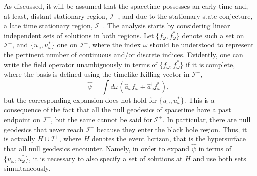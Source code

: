 \documentclass[
12pt,		%
openright,	%
twoside,  %
a4paper,			%
chapter=TITLE,		%
english,			%
french,				%
spanish,			%
brazil				%
]{USPSC-classe/USPSC}
\begin{document}
As discussed, it will be assumed that the spacetime possesses an early time and, at least, distant stationary region, $\mathscr{I}^-$, and due to the stationary state conjecture, a late time stationary region, $\mathscr{I}^+$. The analysis starts by considering linear independent sets of solutions in both regions. Let $\{f_{\omega},f_{\omega}^*\}$ denote such a set on $\mathscr{I}^-$, and $\{u_{\omega},u_{\omega}^*\}$ one on $\mathscr{I}^+$, where the index $\omega$ should be understood to represent the pertinent number of continuous and/or discrete indices. Evidently, one can write the field operator unambiguously in terms of $\{f_{\omega},f_{\omega}^*\}$ if it is complete, where the basis is defined using the timelike Killing vector in $\mathscr{I}^-$, 
\begin{equation}\label{7890}
    \hat{\psi}=\int d\omega(\hat{a}_{\omega}f_{\omega}+\hat{a}^{\dag}_{\omega}f_{\omega}^*),
\end{equation}
but the corresponding expansion does not hold for $\{u_{\omega},u_{\omega}^*\}$. This is a consequence of the fact that all the null geodesics of spacetime have a past endpoint on $\mathscr{I}^-$, but the same cannot be said for $\mathscr{I}^+$. In particular, there are null geodesics that never reach $\mathscr{I}^+$ because they enter the black hole region. Thus, it is actually $H\cup\mathscr{I}^+$, where $H$ denotes the event horizon, that is the hypersurface that all null geodesics encounter. Namely, in order to expand $\hat{\psi}$ in terms of $\{u_{\omega},u_{\omega}^*\}$, it is necessary to also specify a set of solutions at $H$ and use both sets simultaneously.
\end{document}
